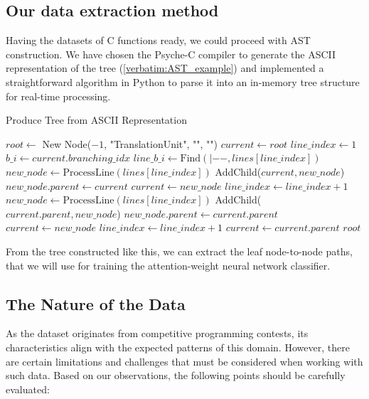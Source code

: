 \documentclass[10pt,english,a4paper]{report}
\begin{document}
\subsection{Our data extraction method}

Having the datasets of C functions ready, we could proceed with AST construction.
We have chosen the Psyche-C compiler to generate the ASCII representation of the 
tree (\ref{verbatim:AST_example}) and implemented a straightforward algorithm in Python to parse it into an in-memory tree structure for real-time processing.

\begin{algorithm}
    \caption{Produce Tree from ASCII Representation}
    \begin{algorithmic}[1]
        \State $root \gets$ New Node($-1$, "TranslationUnit", "", "")
        \State $current \gets root$
        \State $line\_index \gets 1$
            \State $b\_i \gets current.branching\_idx$
            \State $line\_b\_i \gets \text{Find}(|--, lines[line\_index])$
                \State $new\_node \gets \text{ProcessLine}(lines[line\_index])$
                \State AddChild($current, new\_node$)
                \State $new\_node.parent \gets current$
                \State $current \gets new\_node$
                \State $line\_index \gets line\_index + 1$
                \State $new\_node \gets \text{ProcessLine}(lines[line\_index])$
                \State AddChild($current.parent, new\_node$)
                \State $new\_node.parent \gets current.parent$
                \State $current \gets new\_node$
                \State $line\_index \gets line\_index + 1$
            \Else
                \State $current \gets current.parent$
            \EndIf
        \EndWhile
        \State \Return $root$
    \EndProcedure
    \end{algorithmic}
    \end{algorithm}
    
From the tree constructed like this, we can extract the leaf node-to-node paths, that we will 
use for training the attention-weight neural network classifier.


\subsection{The Nature of the Data}
\label{item:nature_of_data}
As the dataset originates from competitive programming contests, its characteristics align with the expected patterns of this domain. However, there are certain limitations and challenges that must be considered when working with such data. Based on our observations, the following points should be carefully evaluated:
\end{document}
